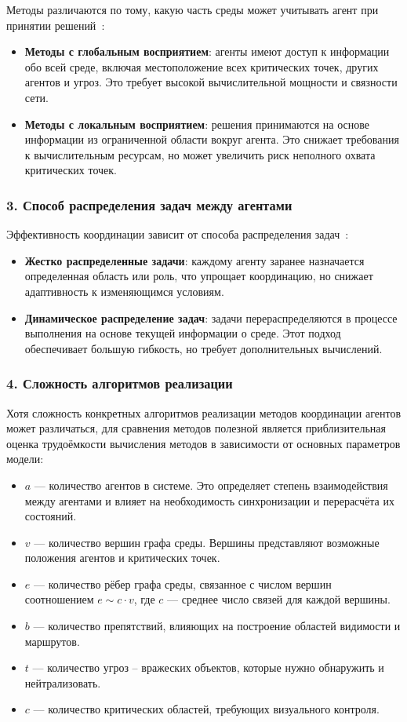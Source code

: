 Методы различаются по тому, какую часть среды может учитывать агент при принятии решений~\cite{ieee-mas}:
\begin{itemize}
	\item \textbf{Методы с глобальным восприятием}: агенты имеют доступ к информации обо всей среде, включая местоположение всех критических точек, других агентов и угроз.
	Это требует высокой вычислительной мощности и связности сети.  
	\item \textbf{Методы с локальным восприятием}: решения принимаются на основе информации из ограниченной области вокруг агента.
	Это снижает требования к вычислительным ресурсам, но может увеличить риск неполного охвата критических точек.
\end{itemize}

\subsubsection*{3. Способ распределения задач между агентами}

Эффективность координации зависит от способа распределения задач~\cite{role-based}:
\begin{itemize}
	\item \textbf{Жестко распределенные задачи}: каждому агенту заранее назначается определенная область или роль, что упрощает координацию, но снижает адаптивность к изменяющимся условиям.
	\item \textbf{Динамическое распределение задач}: задачи перераспределяются в процессе выполнения на основе текущей информации о среде.
	Этот подход обеспечивает большую гибкость, но требует дополнительных вычислений.
\end{itemize}

\subsubsection*{4. Сложность алгоритмов реализации}

Хотя сложность конкретных алгоритмов реализации методов координации агентов может различаться, для сравнения методов полезной является приблизительная оценка трудоёмкости вычисления методов в зависимости от основных параметров модели:
\begin{itemize}
	\item $a$ — количество агентов в системе. Это определяет степень взаимодействия между агентами и влияет на необходимость синхронизации и перерасчёта их состояний.
	\item $v$ — количество вершин графа среды. Вершины представляют возможные положения агентов и критических точек.
	\item $e$ — количество рёбер графа среды, связанное с числом вершин соотношением $e \sim c \cdot v$, где $c$ — среднее число связей для каждой вершины.
	\item $b$ — количество препятствий, влияющих на построение областей видимости и маршрутов.
	\item $t$ — количество угроз -- вражеских объектов, которые нужно обнаружить и нейтрализовать.
	\item $c$ — количество критических областей, требующих визуального контроля.
\end{itemize}

